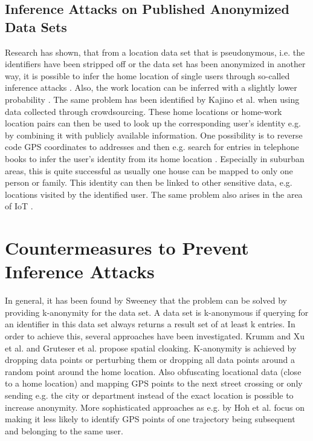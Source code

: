 \subsection{Inference Attacks on Published Anonymized Data Sets}
Research has shown, that from a location data set that is pseudonymous, i.e. the identifiers have been stripped off or the data set has been anonymized in another way, it is possible to infer the home location of single users through so-called inference attacks \parencite{krumm, cellphone, privacy-home-work-pairs, hoh2006enhancing, twitter}. Also, the work location can be inferred with a slightly lower probability \parencite{cellphone, privacy-home-work-pairs}. The same problem has been identified by Kajino et al. \parencite{crowdsourcing} when using data collected through crowdsourcing.
These home locations or home-work location pairs can then be used to look up the corresponding user's identity e.g. by combining it with publicly available information. One possibility is to reverse code GPS coordinates to addresses and then e.g. search for entries in telephone books to infer the user's identity from its home location \parencite{krumm, privacy-home-work-pairs, hoh2006enhancing}. Especially in suburban areas, this is quite successful as usually one house can be mapped to only one person or family. This identity can then be linked to other sensitive data, e.g. locations visited by the identified user. The same problem also arises in the area of IoT \parencite{iot, hoh2006enhancing}.

\section{Countermeasures to Prevent Inference Attacks}
In general, it has been found by Sweeney \parencite{k-anonymity} that the problem can be solved by providing k-anonymity for the data set. A data set is k-anonymous if querying for an identifier in this data set always returns a result set of at least k entries.
In order to achieve this, several approaches have been investigated. Krumm \parencite{krumm} and Xu et al. \parencite{xu2018location} and Gruteser et al. \parencite{gruteser2003anonymous} propose spatial cloaking. K-anonymity is achieved by dropping data points or perturbing them or dropping all data points around a random point around the home location. Also obfuscating locational data (close to a home location) and mapping GPS points to the next street crossing or only sending e.g. the city or department instead of the exact location is possible to increase anonymity.
More sophisticated approaches as e.g. by Hoh et al. \parencite{time-to-confusion} focus on making it less likely to identify GPS points of one trajectory being subsequent and belonging to the same user.

